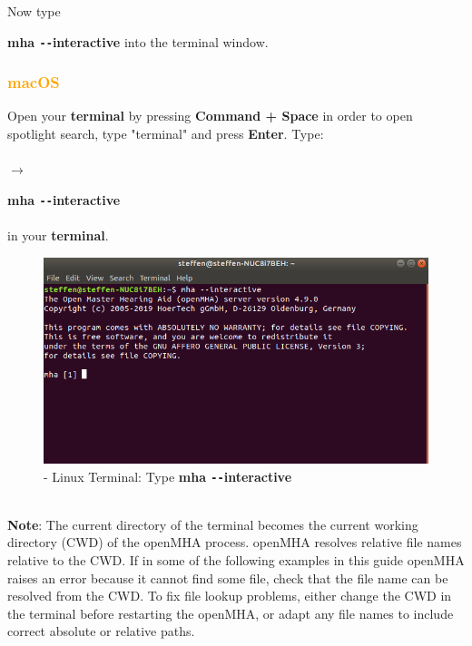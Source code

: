 \documentclass[11pt,a4paper,twoside]{article}
\newcommand{\+}{\discretionary{\mbox{\scriptsize$\hookleftarrow$}}{}{}}
\begin{document}
    Now type {{\ttfamily \textbf{mha \texttt{-{}-}interactive}}  into the terminal window. 
   


\subsubsection*{\textcolor{orange}{macOS}}

Open your \textbf{terminal} by pressing \textbf{Command + Space} in order to open spotlight search, type "terminal" and press \textbf{Enter}. Type: \\ \\
$\rightarrow$ {{\ttfamily \textbf{mha \texttt{-{}-}interactive}} \\ \\ in your \textbf{terminal}.\\


\begin{figure}[H]
\centering
\includegraphics[scale=0.4]{mha_interactive.png}
\caption{- Linux Terminal: Type {{\ttfamily \textbf{mha \texttt{-{}-}interactive}}}}
\end{figure}


\dotfill \\

\large{\textbf{Note}}:
The current directory of the terminal becomes the
current working directory (CWD) of the openMHA process.
openMHA resolves relative file names relative to the CWD.
If in some of the following examples in this guide
openMHA raises an error because it cannot find some file,
check that the file name can be resolved from the CWD.
To fix file lookup problems, either change the CWD in the
terminal before restarting the openMHA, or adapt any file
names to include correct absolute or relative paths.
\\

}}
\end{document}
